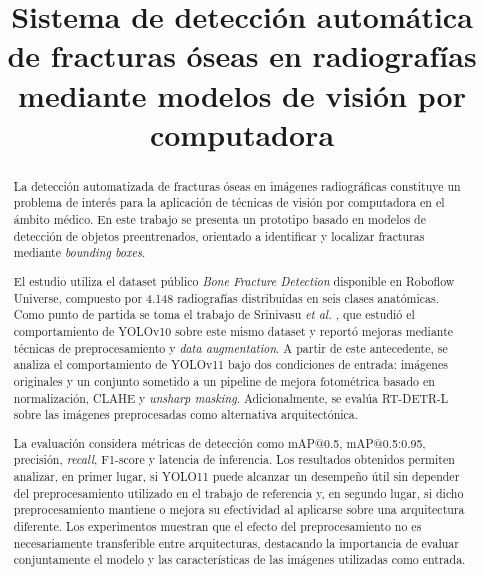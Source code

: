 \documentclass[conference]{IEEEtran}
\begin{document}
\title{Sistema de detección automática de fracturas óseas en radiografías mediante modelos de visión por computadora}

\author{
\and
{}
}

\maketitle


\begin{abstract}

La detección automatizada de fracturas óseas en imágenes radiográficas constituye un problema de interés para la aplicación de técnicas de visión por computadora en el ámbito médico. En este trabajo se presenta un prototipo basado en modelos de detección de objetos preentrenados, orientado a identificar y localizar fracturas mediante \textit{bounding boxes}.

El estudio utiliza el dataset público \textit{Bone Fracture Detection} disponible en Roboflow Universe, compuesto por 4.148 radiografías distribuidas en seis clases anatómicas. Como punto de partida se toma el trabajo de Srinivasu \textit{et al.} \cite{b3_srinivasu}, que estudió el comportamiento de YOLOv10 sobre este mismo dataset y reportó mejoras mediante técnicas de preprocesamiento y \textit{data augmentation}. A partir de este antecedente, se analiza el comportamiento de YOLOv11 bajo dos condiciones de entrada: imágenes originales y un conjunto sometido a un pipeline de mejora fotométrica basado en normalización, CLAHE y \textit{unsharp masking}. Adicionalmente, se evalúa RT-DETR-L sobre las imágenes preprocesadas como alternativa arquitectónica.

La evaluación considera métricas de detección como mAP@0.5, mAP@0.5:0.95, precisión, \textit{recall}, F1-score y latencia de inferencia. Los resultados obtenidos permiten analizar, en primer lugar, si YOLO11 puede alcanzar un desempeño útil sin depender del preprocesamiento utilizado en el trabajo de referencia y, en segundo lugar, si dicho preprocesamiento mantiene o mejora su efectividad al aplicarse sobre una arquitectura diferente. Los experimentos muestran que el efecto del preprocesamiento no es necesariamente transferible entre arquitecturas, destacando la importancia de evaluar conjuntamente el modelo y las características de las imágenes utilizadas como entrada.

\end{abstract}
\end{document}
